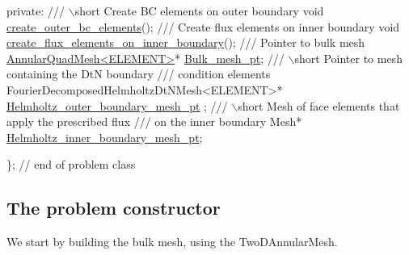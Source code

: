 \begin{DoxyCodeInclude}
\textcolor{keyword}{private}:
 \textcolor{comment}{}
\textcolor{comment}{ /// \(\backslash\)short Create BC elements on outer boundary}
\textcolor{comment}{} \textcolor{keywordtype}{void} \hyperlink{classFourierDecomposedHelmholtzProblem_a359d402bb4aed7d83973248d82085efb}{create\_outer\_bc\_elements}();
 \textcolor{comment}{}
\textcolor{comment}{ /// Create flux elements on inner boundary}
\textcolor{comment}{} \textcolor{keywordtype}{void} \hyperlink{classFourierDecomposedHelmholtzProblem_a81d64611f2de2492cec6b0621d8124b0}{create\_flux\_elements\_on\_inner\_boundary}();
\textcolor{comment}{}
\textcolor{comment}{ /// Pointer to bulk mesh}
\textcolor{comment}{} \hyperlink{classAnnularQuadMesh}{AnnularQuadMesh<ELEMENT>}* \hyperlink{classFourierDecomposedHelmholtzProblem_ad5927e4a2156e96c55ebce044c6f9653}{Bulk\_mesh\_pt};
  \textcolor{comment}{}
\textcolor{comment}{ /// \(\backslash\)short Pointer to mesh containing the DtN boundary}
\textcolor{comment}{ /// condition elements}
\textcolor{comment}{} FourierDecomposedHelmholtzDtNMesh<ELEMENT>* \hyperlink{classFourierDecomposedHelmholtzProblem_ab7aafa9c0ab982d9e1fdc31d802d309b}{Helmholtz\_outer\_boundary\_mesh\_pt}
      ;
\textcolor{comment}{}
\textcolor{comment}{ /// \(\backslash\)short Mesh of face elements that apply the prescribed flux}
\textcolor{comment}{ /// on the inner boundary}
\textcolor{comment}{} Mesh* \hyperlink{classFourierDecomposedHelmholtzProblem_a3ecc5a3fc3407de8985ed9a61402f2f0}{Helmholtz\_inner\_boundary\_mesh\_pt};

\}; \textcolor{comment}{// end of problem class}

\end{DoxyCodeInclude}




 

\hypertarget{index_constr}{}\subsection{The problem constructor}\label{index_constr}
We start by building the bulk mesh, using the {\ttfamily Two\+D\+Annular\+Mesh}.


